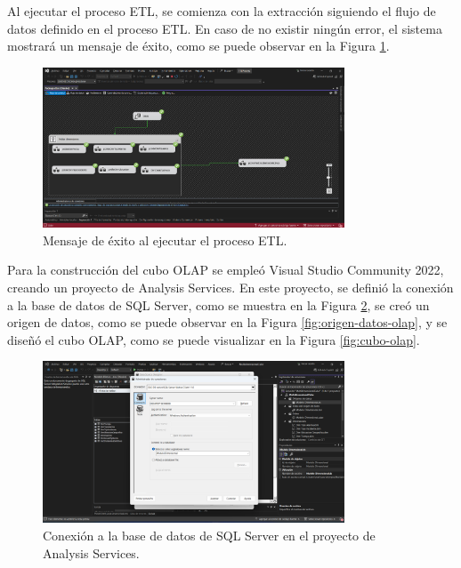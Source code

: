 Al ejecutar el proceso ETL, se comienza con la extracción siguiendo el flujo de datos definido en el proceso ETL. En caso de no
existir ningún error, el sistema mostrará un mensaje de éxito, como se puede observar en la Figura \ref{fig:exito-bi}.

\begin{figure}[H]
    \centering
    \includegraphics[width=0.8\textwidth]{chapters/III-resultados-y-discusion/resources/images/exito-bi.png}
    \caption{Mensaje de éxito al ejecutar el proceso ETL.}
    \label{fig:exito-bi}
\end{figure}

Para la construcción del cubo OLAP se empleó Visual Studio Community 2022, creando un proyecto de Analysis Services. En este
proyecto, se definió la conexión a la base de datos de SQL Server, como se muestra en la Figura \ref{fig:conexion-olap},
se creó un origen de datos, como se puede observar en la Figura \ref{fig:origen-datos-olap}, y se diseñó el cubo OLAP, como se
puede visualizar en la Figura \ref{fig:cubo-olap}.

\begin{figure}[H]
    \centering
    \includegraphics[width=0.8\textwidth]{chapters/III-resultados-y-discusion/resources/images/conexion-olap.png}
    \caption{Conexión a la base de datos de SQL Server en el proyecto de Analysis Services.}
    \label{fig:conexion-olap}
\end{figure}

